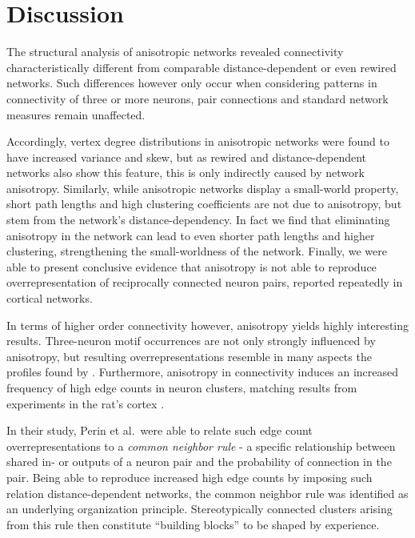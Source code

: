 

\section{Discussion}\label{sec:discussion}

The structural analysis of anisotropic networks revealed connectivity
characteristically different from comparable distance-dependent or
even rewired networks. Such differences however only occur when
considering patterns in connectivity of three or more neurons, pair
connections and standard network measures remain unaffected.

Accordingly, vertex degree distributions in anisotropic networks were
found to have increased variance and skew, but as rewired and
distance-dependent networks also show this feature, this is only
indirectly caused by network anisotropy. Similarly, while
an\-iso\-tro\-pic networks display a small-world property, short path
lengths and high clustering coefficients are not due to anisotropy,
but stem from the network's distance-dependency. In fact we find that
eliminating anisotropy in the network can lead to even shorter path
lengths and higher clustering, strengthening the small-worldness of
the network. Finally, we were able to present conclusive evidence that
anisotropy is not able to reproduce overrepresentation of reciprocally
connected neuron pairs, reported repeatedly in cortical networks.

In terms of higher order connectivity however, anisotropy yields
highly interesting results. Three-neuron motif occurrences are not
only strongly influenced by anisotropy, but resulting
overrepresentations resemble in many aspects the profiles found by
\textcite{Song2005}. Furthermore, anisotropy in connectivity induces
an increased frequency of high edge counts in neuron clusters,
matching results from experiments in the rat's
cortex \parencite{Perin2011}. 

In their study, Perin et al.\ were able to relate such edge count
overrepresentations to a \textit{common neighbor rule} - a specific
relationship between shared in- or outputs of a neuron pair and the
probability of connection in the pair. Being able to reproduce
increased high edge counts by imposing such relation
distance-dependent networks, the common neighbor rule was identified
as an underlying organization principle. Stereotypically connected
clusters arising from this rule then constitute \enquote{building
  blocks} to be shaped by experience.

